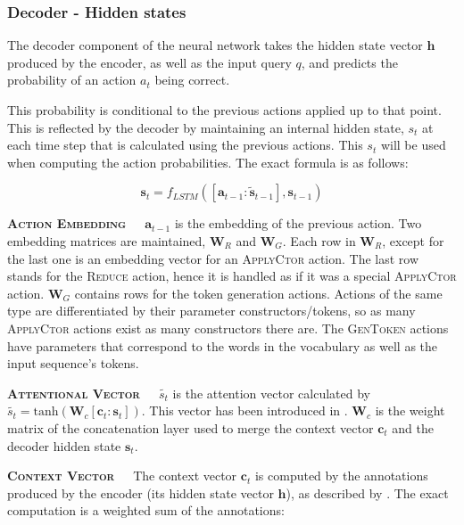\subsubsection{Decoder - Hidden states}

The decoder component of the neural network takes the hidden state vector
\(\mathbf{h}\) produced by the encoder, as well as the input query \(q\),
and predicts the probability of an action \(a_{t}\) being correct.

This probability is conditional to the previous actions applied up to that
point. This is reflected by the decoder by maintaining an internal hidden
state, \(s_{t}\) at each time step that is calculated using the previous actions.
This \(s_{t}\) will be used when computing the action probabilities.
The exact formula is as follows:

\[\textbf{s}_{t} = f_{LSTM}([\textbf{a}_{t-1} : \tilde{\textbf{s}}_{t-1}], \textbf{s}_{t-1})\]

\textbf{\textsc{Action Embedding}}\ \ \ \(\textbf{a}_{t-1}\) is the embedding
of the previous action. Two embedding matrices are maintained, \(\textbf{W}_{R}\)
and \(\textbf{W}_{G}\). Each row in \(\textbf{W}_{R}\), except for the last one
is an embedding vector for an \textsc{ApplyCtor} action. The last row stands for
the \textsc{Reduce} action, hence it is handled as if it was a special \textsc{ApplyCtor}
action. \(\textbf{W}_{G}\) contains rows for the token generation actions. Actions of the
same type are differentiated by their parameter constructors/tokens, so as many
\textsc{ApplyCtor} actions exist as many constructors there are. The \textsc{GenToken}
actions have parameters that correspond to the words in the vocabulary as well
as the input sequence's tokens.

\textbf{\textsc{Attentional Vector}}\ \ \ \(\tilde{s_{t}}\) is the attention vector
calculated by \(\tilde{s_{t}} = \text{tanh}(\textbf{W}_{c}[\textbf{c}_{t} :
\textbf{s}_{t}])\). This vector has been introduced in \cite{LuongPhamManning2015}. %
\(\textbf{W}_{c}\) is the weight matrix of the concatenation layer used to
merge the context vector \(\textbf{c}_{t}\) and the decoder hidden
state \(\textbf{s}_{t}\).

\textbf{\textsc{Context Vector}}\ \ \ The context vector \(\textbf{c}_{t}\) is
computed by the annotations produced by the encoder (its hidden state vector
\(\textbf{h}\)), as described by \cite{BahdanauChoBengio2014}. The exact computation
is a weighted sum of the annotations:

